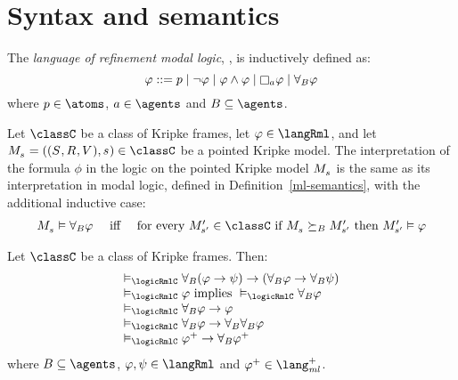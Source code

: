 \section{Syntax and semantics}\label{rml-semantics}

\begin{definition}
The {\em language of refinement modal logic}, \langRml{}, is inductively defined as:
$$
\phi ::= 
    \atomP \mid
    \lnot \phi \mid
    \phi \land \phi \mid
    \necessaryA \phi \mid
    \allrefsBs \phi
$$
where $\atomP \in \atoms$, $\agentA \in \agents$ and $\agentsB \subseteq \agents$.
\end{definition}

\begin{definition}
Let $\classC$ be a class of Kripke frames, let $\phi \in \langRml$, and let $\kPModelAndTuple{\kStateS} \in \classC$ be a pointed Kripke model.
The interpretation of the formula $\phi$ in the logic \logicRmlC{} on the pointed Kripke model $\kPModel{\kStateS}$ is the same as its interpretation in modal logic, defined in Definition~\ref{ml-semantics}, with the additional inductive case:
$$
\begin{array}{lcl}
    \kPModel{\kStateS} \entails \allrefsBs \phi & \text{ iff } & \text{for every } \kPModelP{\kStateSP} \in \classC \text{ if } \kPModel{\kStateS} \simulatesBs \kPModelP{\kStateSP} \text{ then } \kPModelP{\kStateSP} \entails \phi
\end{array}
$$
\end{definition}

\begin{proposition}\label{rml-validities}
Let $\classC$ be a class of Kripke frames. Then:
$$
\begin{array}{l}
    \entails_\logicRmlC \allrefsBs (\phi \implies \psi) \implies (\allrefsBs \phi \implies \allrefsBs \psi)\\
    \entails_\logicRmlC \phi \text{ implies } \entails_\logicRmlC \allrefsBs \phi\\
    \entails_\logicRmlC \allrefsBs \phi \implies \phi\\
    \entails_\logicRmlC \allrefsBs \phi \implies \allrefsBs \allrefsBs \phi\\
    \entails_\logicRmlC \phi^+ \implies \allrefsBs \phi^+
\end{array}
$$
where $\agentsB \subseteq \agents$, $\phi, \psi \in \langRml$ and $\phi^+ \in \langMlPlus$.
\end{proposition}

